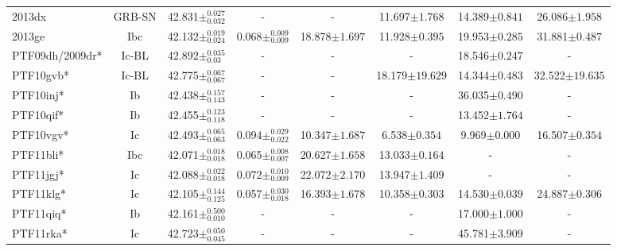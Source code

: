\documentclass[a4paper,fleqn,usenatbib]{mnras}
\begin{document}
\begin{table}
\begin{minipage}{160mm}
\begin{tabular}{lccccccc}
2013dx & GRB-SN & 42.831$\pm^{0.027}_{0.032}$ & - & - & 11.697$\pm 1.768$ & 14.389$\pm 0.841$ & 26.086$\pm 1.958$\\
2013ge & Ibc & 42.132$\pm^{0.019}_{0.024}$ & 0.068$\pm^{0.009}_{0.009}$ & 18.878$\pm{1.697}$ & 11.928$\pm 0.395$ & 19.953$\pm 0.285$ & 31.881$\pm 0.487$\\
PTF09dh/2009dr* & Ic-BL &42.892$\pm^{0.035}_{0.03}$& - & - & - & 18.546$\pm 0.247$ & - \\
PTF10gvb* & Ic-BL & 42.775$\pm^{0.067}_{0.067}$ & - & - & 18.179$\pm 19.629$ & 14.344$\pm 0.483$ & 32.522$\pm 19.635$\\
PTF10inj* & Ib & 42.438$\pm^{0.157}_{0.143}$ & - & - & - & 36.035$\pm 0.490$ & -\\
PTF10qif* & Ib & 42.455$\pm^{0.123}_{0.118}$ & - & - & - & 13.452$\pm 1.764$ & -\\
PTF10vgv* & Ic & 42.493$\pm^{0.065}_{0.063}$ & 0.094$\pm^{0.029}_{0.022}$ & 10.347$\pm{1.687}$ & 6.538$\pm 0.354$ & 9.969$\pm 0.000$ & 16.507$\pm 0.354$\\
PTF11bli* & Ibc & 42.071$\pm^{0.018}_{0.018}$ & 0.065$\pm^{0.008}_{0.007}$ & 20.627$\pm{1.658}$ & 13.033$\pm 0.164$ & - & -\\
PTF11jgj* & Ic & 42.088$\pm^{0.022}_{0.018}$ & 0.072$\pm^{0.010}_{0.009}$ & 22.072$\pm{2.170}$ & 13.947$\pm 1.409$ & - & -\\
PTF11klg* & Ic & 42.105$\pm^{0.144}_{0.125}$ & 0.057$\pm^{0.030}_{0.018}$ & 16.393$\pm{1.678}$ & 10.358$\pm 0.303$ & 14.530$\pm 0.039$ & 24.887$\pm 0.306$\\
PTF11qiq* & Ib & 42.161$\pm^{0.500}_{0.010}$ & - & - & - & 17.000$\pm 1.000$ & -\\
PTF11rka* & Ic & 42.723$\pm^{0.050}_{0.045}$ & - & - & - & 45.781$\pm 3.909$ & -\\
\hline
\end{tabular}
\end{minipage}
\end{table}
\end{document}
